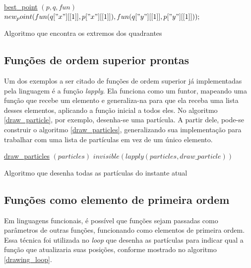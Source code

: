 \documentclass[rel_mlp]{iiufrgs}
\begin{document}
    \begin{algorithm}
    \label{best_point}
    \underline{best{\_}point} $(p, q, fun)$\;
    $ new_point(fun(q["x"][[1]], p["x"][[1]]), fun(q["y"][[1]], p["y"][[1]])); $\;
    \caption{Algoritmo que encontra os extremos dos quadrantes}
    \end{algorithm}

    \subsection{Funções de ordem superior prontas}

    Um dos exemplos a ser citado de funções de ordem superior já implementadas pela linguagem é a função \textit{lapply}. Ela funciona como um funtor, mapeando uma função que recebe um elemento e generaliza-na para que ela receba uma lista desses elementos, aplicando a função inicial a todos eles. No algoritmo \ref{draw_particle}, por exemplo, desenha-se uma partícula. A partir dele, pode-se construir o algoritmo \ref{draw_particles}, generalizando sua implementação para trabalhar com uma lista de partículas em vez de um único elemento.

    \begin{algorithm}
	\label{draw_particles}
    \underline{draw{\_}particles} $(particles)$\;
	$invisible(lapply(particles, draw{\_}particle)) $\;
	\caption{Algoritmo que desenha todas as partículas do instante atual}
	\end{algorithm}

	\subsection{Funções como elemento de primeira ordem}

    Em linguagens funcionais, é possível que funções sejam passadas como parâmetros de outras funções, funcionando como elementos de primeira ordem. Essa técnica foi utilizada no \textit{loop} que desenha as partículas para indicar qual a função que atualizaria suas posições, conforme mostrado no algoritmo \ref{drawing_loop}.
\end{document}
